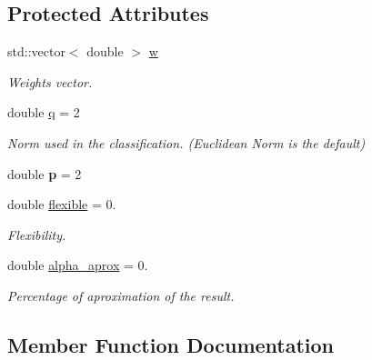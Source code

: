 \subsection*{Protected Attributes}
\begin{DoxyCompactItemize}
\item 
\mbox{\label{class_primal_classifier_a6191919f25a037b6a61d00ebda18f41e}} 
std\+::vector$<$ double $>$ \hyperlink{class_primal_classifier_a6191919f25a037b6a61d00ebda18f41e}{w}
\begin{DoxyCompactList}\small\item\em Weights vector. \end{DoxyCompactList}\item 
\mbox{\label{class_primal_classifier_ae30c00c25bce4b1623baa54b5e2812b4}} 
double \hyperlink{class_primal_classifier_ae30c00c25bce4b1623baa54b5e2812b4}{q} = 2
\begin{DoxyCompactList}\small\item\em Norm used in the classification. (Euclidean Norm is the default) \end{DoxyCompactList}\item 
\mbox{\label{class_primal_classifier_ac5b59dafe749376fb067ceda690f405d}} 
double {\bfseries p} = 2
\item 
\mbox{\label{class_primal_classifier_a5d41554dc1158ede39d387fecf73c96e}} 
double \hyperlink{class_primal_classifier_a5d41554dc1158ede39d387fecf73c96e}{flexible} = 0.
\begin{DoxyCompactList}\small\item\em Flexibility. \end{DoxyCompactList}\item 
\mbox{\label{class_primal_classifier_a2668546ac4a39e10f72cbd2e865c41a7}} 
double \hyperlink{class_primal_classifier_a2668546ac4a39e10f72cbd2e865c41a7}{alpha\+\_\+aprox} = 0.
\begin{DoxyCompactList}\small\item\em Percentage of aproximation of the result. \end{DoxyCompactList}\end{DoxyCompactItemize}


\subsection{Member Function Documentation}
\mbox{\label{class_primal_classifier_a637fc3cb89994277e902758c7fc3f763}} 
